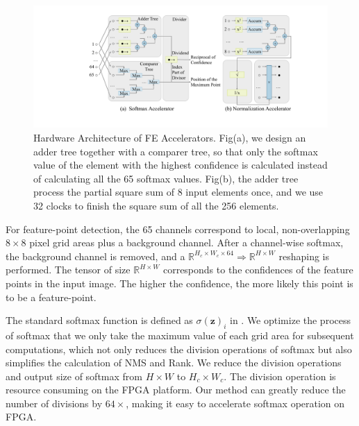 \begin{figure}[t]
 \centering 
 \includegraphics[width=0.99\linewidth]{fig/FEaccelerator.pdf}
 \vspace{-7mm}
 \caption{Hardware Architecture of FE Accelerators. Fig(a), we design an adder tree together with a comparer tree, so that only the softmax value of the element with the highest confidence is calculated instead of calculating all the 65 softmax values. Fig(b), the adder tree process the partial square sum of 8 input elements once, and we use 32 clocks to finish the square sum of all the 256 elements.}
 \label{fig:FEaccelerator}
\end{figure}

For feature-point detection, the 65 channels correspond to local, non-overlapping $8 \times 8$ pixel grid areas plus a background channel. 
After a channel-wise softmax, the background channel is removed, and a $\mathbb{R}^{H_c\times W_c\times64}\Rightarrow \mathbb{R}^{H\times W}$ reshaping is performed. 
The tensor of size $\mathbb{R}^{H\times W}$ corresponds to the confidences of the feature points in the input image. The higher the confidence, the more likely this point is to be a feature-point.

The standard softmax function is defined as $\sigma (\mathbf {z} )_{i}$ in .
We optimize the process of softmax that we only take the maximum value of each grid area for subsequent computations, which not only reduces the division operations of softmax but also simplifies the calculation of NMS and Rank.
We reduce the division operations and output size of softmax from $H \times W$ to $H_c \times W_c$.
The division operation is resource consuming on the FPGA platform. 
Our method can greatly reduce the number of divisions by $64 \times$, making it easy to accelerate softmax operation on FPGA.

